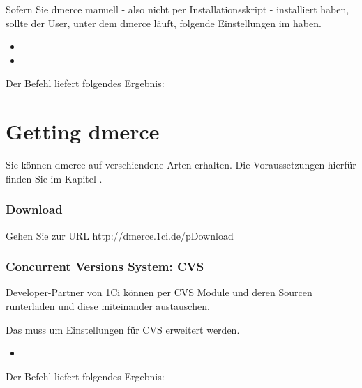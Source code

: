 Sofern Sie dmerce manuell - also nicht per Installationsskript -
installiert haben, sollte der User, unter dem dmerce l\"auft, folgende
Einstellungen im  haben.

\begin{itemize}
\item {}
\item {}
\end{itemize}

Der Befehl  liefert folgendes Ergebnis:


\section{Getting dmerce}
\label{Gettingdmerce}

Sie k\"onnen dmerce auf verschiendene Arten erhalten. Die
Voraussetzungen hierf\"ur finden Sie im Kapitel .

\subsubsection{Download}

Gehen Sie zur URL http://dmerce.1ci.de/pDownload

\subsubsection{Concurrent Versions System: CVS}

Developer-Partner von 1Ci k\"onnen per CVS Module und deren Sourcen runterladen
und diese miteinander austauschen.

Das  muss um Einstellungen f\"ur CVS erweitert werden.

\begin{itemize}
\item {}
\end{itemize}

Der Befehl  liefert folgendes Ergebnis:


